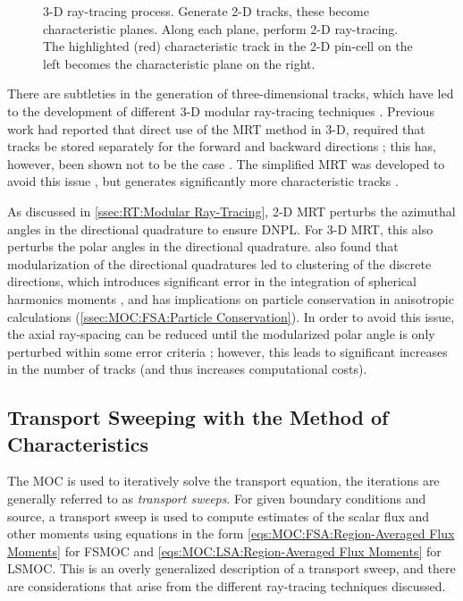 {{{{          \begin{figure}[h]
            \centering
            \def\svgwidth{0.85\linewidth}
            
            \caption{3-D ray-tracing process. Generate 2-D tracks, these become characteristic planes. Along each plane, perform 2-D ray-tracing. The highlighted (red) characteristic track in the 2-D pin-cell on the left becomes the characteristic plane on the right.}
            \label{fig:RT:3-D Ray-tracing}
          \end{figure}

          There are subtleties in the generation of three-dimensional tracks, which have led to the development of different 3-D modular ray-tracing techniques \cite{Kochunas2013,Shaner2015}.
          Previous work had reported that direct use of the \ac{MRT} method in 3-D, required that tracks be stored separately for the forward and backward directions \cite{Kochunas2013};
          this has, however, been shown not to be the case \cite{Shaner2015}.
          The simplified \ac{MRT} was developed to avoid this issue \cite{Kochunas2013}, but generates significantly more characteristic tracks \cite{Shaner2015}.

          As discussed in \cref{ssec:RT:Modular Ray-Tracing}, 2-D \ac{MRT} perturbs the azimuthal angles in the directional quadrature to ensure \ac{DNPL}.
          For 3-D \ac{MRT}, this also perturbs the polar angles in the directional quadrature.
          \citet{Kochunas2013} also found that modularization of the directional quadratures led to clustering of the discrete directions, which introduces significant error in the integration of spherical harmonics moments \cite{Kochunas2013}, and has implications on particle conservation in anisotropic calculations (\cref{ssec:MOC:FSA:Particle Conservation}).
          In order to avoid this issue, the axial ray-spacing can be reduced until the modularized polar angle is only perturbed within some error criteria \cite{Kochunas2013}; however, this leads to significant increases in the number of tracks (and thus increases computational costs).
        }
      }

      \subsection{Transport Sweeping with the Method of Characteristics}{\label{ssec:RT:Transport Sweeping with the Method of Characteristics}
        The \ac{MOC} is used to iteratively solve the transport equation, the iterations are generally referred to as \emph{transport sweeps}.
        For given boundary conditions and source, a transport sweep is used to compute estimates of the scalar flux and other moments using equations in the form \cref{eqs:MOC:FSA:Region-Averaged Flux Moments} for \ac{FSMOC} and \cref{eqs:MOC:LSA:Region-Averaged Flux Moments} for \ac{LSMOC}.
        This is an overly generalized description of a transport sweep, and there are considerations that arise from the different ray-tracing techniques discussed.

}}}
